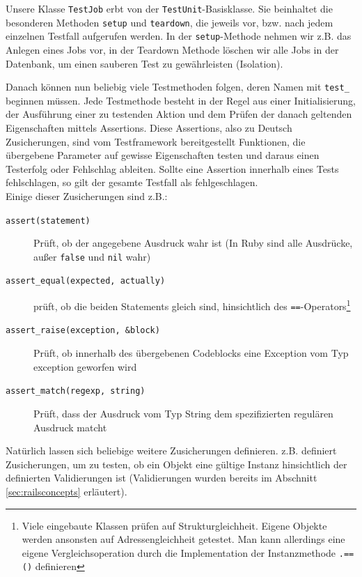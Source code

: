 Unsere Klasse \texttt{TestJob} erbt von der \texttt{TestUnit}-Basisklasse. Sie beinhaltet die besonderen Methoden \texttt{setup} und \texttt{teardown}, die jeweils vor, bzw. nach jedem einzelnen Testfall aufgerufen werden.
In der \texttt{setup}-Methode nehmen wir z.B. das Anlegen eines Jobs vor, in der Teardown Methode löschen wir alle Jobs in der Datenbank, um einen sauberen Test zu gewährleisten (Isolation).

Danach können nun beliebig viele Testmethoden folgen, deren Namen mit \texttt{test\_} beginnen müssen.
Jede Testmethode besteht in der Regel aus einer Initialisierung, der Ausführung einer zu testenden Aktion und dem Prüfen der danach geltenden Eigenschaften mittels Assertions. Diese Assertions, also zu Deutsch Zusicherungen, sind vom Testframework bereitgestellt Funktionen, die übergebene Parameter auf gewisse Eigenschaften testen und daraus einen Testerfolg oder Fehlschlag ableiten. Sollte eine Assertion innerhalb eines Tests fehlschlagen, so gilt der gesamte Testfall als fehlgeschlagen. \\
Einige dieser Zusicherungen sind z.B.:
\begin{description}
 \item[\texttt{assert(statement)}] Prüft, ob der angegebene Ausdruck wahr ist (In Ruby sind alle Ausdrücke, außer \texttt{false} und \texttt{nil} wahr)
 \item[\texttt{assert\_equal(expected, actually)}] prüft, ob die beiden Statements gleich sind, hinsichtlich des \texttt{==}-Operators\footnote{Viele eingebaute Klassen prüfen auf Strukturgleichheit. Eigene Objekte werden ansonsten auf Adressengleichheit getestet. Man kann allerdings eine eigene Vergleichsoperation durch die Implementation der Instanzmethode \texttt{.==()} definieren}
 
 \item[\texttt{assert\_raise(exception, \&block)}] Prüft, ob innerhalb des übergebenen Codeblocks eine Exception vom Typ exception geworfen wird
 \item[\texttt{assert\_match(regexp, string)}] Prüft, dass der Ausdruck vom Typ String dem spezifizierten regulären Ausdruck matcht
\end{description}
Natürlich lassen sich beliebige weitere Zusicherungen definieren.  z.B. definiert Zusicherungen, um zu testen, ob ein Objekt eine gültige Instanz hinsichtlich der definierten Validierungen ist (Validierungen wurden bereits im Abschnitt \ref{sec:railsconcepts} erläutert).

